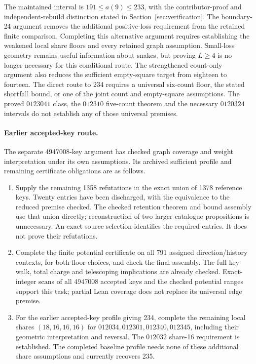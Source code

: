 \documentclass[11pt,a4paper]{article}
\theoremstyle{definition}
\theoremstyle{remark}
\begin{document}
The maintained interval is $191\le a(9)\le233$, with the contributor-proof
and independent-rebuild distinction stated in Section~\ref{sec:verification}.
The boundary-24 argument removes the additional positive-loss requirement
from the retained finite comparison. Completing this alternative argument requires establishing the weakened
local share floors and every retained graph assumption. Small-loss geometry remains useful information about snakes,
but proving $L\ge4$ is no longer necessary for this conditional route.
The strengthened count-only argument also reduces the sufficient
empty-square target from eighteen to fourteen.
The direct route to 234 requires a universal six-count floor, the stated
shortfall bound, or one of the joint count and empty-square assumptions.
The proved $0123041$ class, the $012310$ five-count theorem and the necessary
$0120324$ intervals do not establish any of those universal premises.
\paragraph{Earlier accepted-key route.}
The separate 4947008-key argument has checked graph coverage and weight
interpretation under its own assumptions. Its archived sufficient
profile and remaining certificate obligations are as follows.

\begin{enumerate}
\item Supply the remaining 1358 refutations in the exact union of 1378
reference keys. Twenty entries have been discharged, with the equivalence
to the reduced premise checked. The checked retention theorem and bound assembly use that
union directly; reconstruction of two larger catalogue propositions is
unnecessary. An exact source selection identifies the required entries.
It does not prove their refutations.
\item Complete the finite potential certificate on all 791 assigned
direction/history contexts, for both floor choices, and check the final
assembly. The full-key walk, total charge and telescoping implications
are already checked. Exact-integer scans of all 4947008 accepted keys and
the checked potential ranges support this task; partial Lean coverage
does not replace its universal edge premise.
\item For the earlier accepted-key profile giving 234, complete the remaining local shares
$(18,16,16,16)$ for $012034,012301,012340,012345$, including
their geometric interpretation and reversal. The $012032$ share-16
requirement is established. The completed baseline profile needs none
of these additional share assumptions and currently recovers 235.
\end{enumerate}
\end{document}
